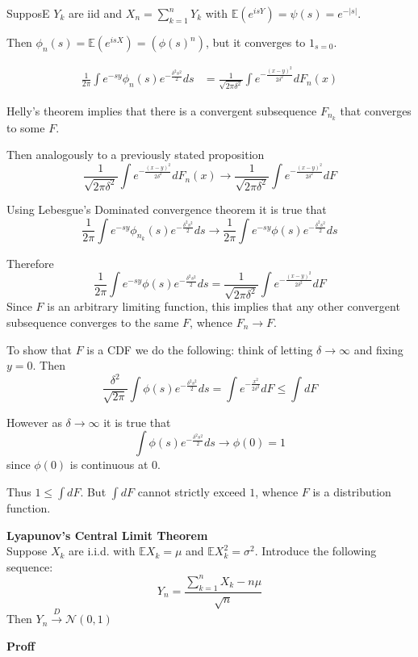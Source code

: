 \documentclass[a4paper]{article}
\newcommand{\brac}[1]{{\left ( #1 \right )}}
\newcommand{\abs}[1]{{\left | #1 \right |}}
\newcommand{\Ex}{\mathbb{E}}
\begin{document}
SupposE $Y_k$ are iid and $X_n = \sum_{k=1}^n Y_k$ with $\Ex\brac{e^{isY}} = \psi(s) = e^{-\abs{s}}$.

Then $\phi_n(s) = \Ex\brac{e^{isX}} = \brac{\phi(s)^n}$, but it converges to $1_{s=0}$.


\begin{align*}
	\frac{1}{2\pi}\int e^{-sy} \phi_n(s) e^{-\frac{\delta^2 s^2}{2}}ds
	& = \frac{1}{\sqrt{2\pi\delta^2}}\int e^{-\frac{{(x-y)}^2}{2\delta^2}}dF_n(x)
\end{align*}

Helly's theorem implies that there is a convergent subsequence $F_{n_k}$ that converges to some $F$.

Then analogously to a previously stated proposition
\[\frac{1}{\sqrt{2\pi\delta^2}}\int e^{-\frac{{(x-y)}^2}{2\delta^2}}dF_n(x) \to \frac{1}{\sqrt{2\pi\delta^2}}\int e^{-\frac{{(x-y)}^2}{2\delta^2}}dF\]

Using Lebesgue's Dominated convergence theorem it is true that
\[\frac{1}{2\pi}\int e^{-sy} \phi_{n_k}(s) e^{-\frac{\delta^2 s^2}{2}}ds \to \frac{1}{2\pi}\int e^{-sy} \phi(s) e^{-\frac{\delta^2 s^2}{2}}ds\]

Therefore
\[\frac{1}{2\pi}\int e^{-sy} \phi(s) e^{-\frac{\delta^2 s^2}{2}}ds = \frac{1}{\sqrt{2\pi\delta^2}}\int e^{-\frac{{(x-y)}^2}{2\delta^2}}dF\]
Since $F$ is an arbitrary limiting function, this implies that any other convergent subsequence converges to the same $F$, whence $F_n\to F$.

To show that $F$ is a CDF we do the following: think of letting $\delta\to \infty$ and fixing $y=0$. Then
\[\frac{\delta^2}{\sqrt{2\pi}}\int \phi(s) e^{-\frac{\delta^2 s^2}{2}}ds = \int e^{-\frac{x^2}{2\delta^2}}dF \leq \int dF\]

However as $\delta\to\infty$ it is true that
\[\int \phi(s) e^{-\frac{\delta^2 s^2}{2}}ds\to \phi(0) = 1\]
since $\phi(0)$ is continuous at $0$.

Thus $1 \leq \int dF$. But $\int dF$ cannot strictly exceed $1$, whence $F$ is a distribution function.

\noindent\textbf{Lyapunov's Central Limit Theorem} \hfill\\
Suppose $X_k$ are i.i.d. with $\Ex X_k = \mu$ and $\Ex X_k^2 = \sigma^2$. Introduce the following sequence:
\[Y_n = \frac{\sum_{k=1}^n X_k - n \mu }{\sqrt{n}}\]
Then $Y_n\overset{D}{\to}\mathcal{N}(0,1)$

\textbf{Proff}\hfill\\
\end{document}

